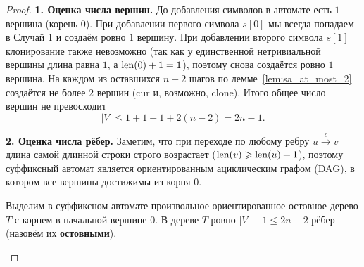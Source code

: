 \begin{proof}
    \textbf{1. Оценка числа вершин.} До добавления символов в автомате есть $1$ вершина (корень $0$). При добавлении первого символа $s[0]$ мы всегда попадаем в Случай 1 и создаём ровно $1$ вершину. При добавлении второго символа $s[1]$ клонирование также невозможно (так как у единственной нетривиальной вершины длина равна $1$, а $\operatorname{len}(0) + 1 = 1$), поэтому снова создаётся ровно $1$ вершина. На каждом из оставшихся $n - 2$ шагов по лемме~\ref{lem:sa_at_most_2} создаётся не более $2$ вершин ($\text{cur}$ и, возможно, $\text{clone}$). Итого общее число вершин не превосходит
    \[
        |V| \le 1 + 1 + 1 + 2(n - 2) = 2n - 1.
    \]

    \textbf{2. Оценка числа рёбер.} Заметим, что при переходе по любому ребру $u \xrightarrow{c} v$ длина самой длинной строки строго возрастает ($\operatorname{len}(v) \geqslant \operatorname{len}(u) + 1$), поэтому суффиксный автомат является ориентированным ациклическим графом (DAG), в котором все вершины достижимы из корня $0$.

    Выделим в суффиксном автомате произвольное ориентированное остовное дерево $T$ с корнем в начальной вершине $0$. В дереве $T$ ровно $|V| - 1 \le 2n - 2$ рёбер (назовём их \textbf{остовными}).

    \begin{center}
    \end{center}


\end{proof}
